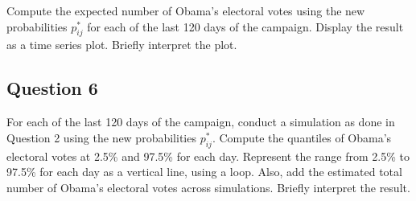\documentclass[]{article}
\begin{document}
Compute the expected number of Obama's electoral votes using the new
probabilities $p_{ij}^\ast$ for each of the last 120 days of the
campaign. Display the result as a time series plot. Briefly interpret
the plot.

\subsection{Question 6}\label{question-6}

For each of the last 120 days of the campaign, conduct a simulation as
done in Question 2 using the new probabilities $p_{ij}^\ast$. Compute
the quantiles of Obama's electoral votes at 2.5\% and 97.5\% for each
day. Represent the range from 2.5\% to 97.5\% for each day as a vertical
line, using a loop. Also, add the estimated total number of Obama's
electoral votes across simulations. Briefly interpret the result.
\end{document}
